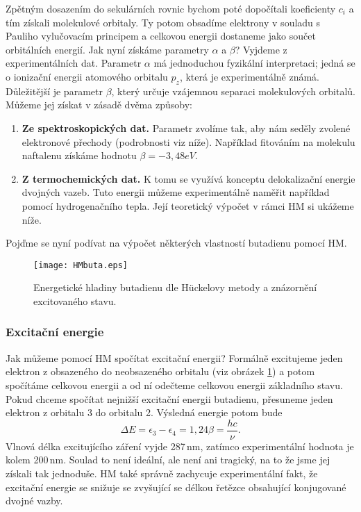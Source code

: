 Zpětným dosazením do sekulárních rovnic bychom poté dopočítali koeficienty $c_i$ a tím získali molekulové orbitaly. Ty potom obsadíme elektrony v souladu s Pauliho vylučovacím principem a celkovou energii dostaneme jako součet orbitálních energií. 
Jak nyní získáme parametry $\alpha$ a $\beta$? Vyjdeme z experimentálních dat. Parametr $\alpha$ má jednoduchou fyzikální interpretaci; jedná se o ionizační energii atomového orbitalu $p_z$, která je experimentálně známá. Důležitější je parametr $\beta$, který určuje vzájemnou separaci molekulových orbitalů. Můžeme jej získat v zásadě dvěma způsoby:
\begin{enumerate}
\item \textbf{Ze spektroskopických dat.} Parametr zvolíme tak, aby nám seděly zvolené elektronové přechody (podrobnosti viz níže). Například fitováním na molekulu naftalenu získáme hodnotu $\beta=-3,48 eV$.
\item \textbf{Z termochemických dat.} K tomu se využívá konceptu delokalizační energie dvojných vazeb. Tuto energii můžeme experimentálně naměřit například pomocí hydrogenačního tepla. Její teoretický výpočet v rámci HM si ukážeme níže. 
\end{enumerate}

Pojďme se nyní podívat na výpočet některých vlastností butadienu pomocí HM. 

\begin{figure}
\centering
\texttt{[image: HMbuta.eps]}
\caption[Energetické hladiny butadienu]{Energetické hladiny butadienu dle H\"{u}ckelovy metody a znázornění excitovaného stavu.}
\label{obr:HMbuta}
\end{figure}

\subsubsection{Excitační energie}

Jak můžeme pomocí HM spočítat excitační energii? Formálně excitujeme jeden elektron z obsazeného do neobsazeného orbitalu (viz obrázek \ref{obr:HMbuta}) a potom spočítáme celkovou energii a od ní odečteme celkovou energii základního stavu. Pokud chceme spočítat nejnižší excitační energii butadienu, přesuneme jeden elektron z orbitalu 3 do orbitalu 2. Výsledná energie potom bude
$$
\Delta E = \epsilon_3-\epsilon_4 = 1,24 \beta = \frac{hc}{\nu} . 
$$
Vlnová délka excitujícího záření vyjde 287\,nm, zatímco experimentální hodnota je kolem 200\,nm.
Soulad to není ideální, ale není ani tragický, na to že jsme jej získali tak jednoduše. HM také správně zachycuje experimentální fakt, že excitační energie se snižuje se zvyšující se délkou řetězce obsahující konjugované dvojné vazby.

